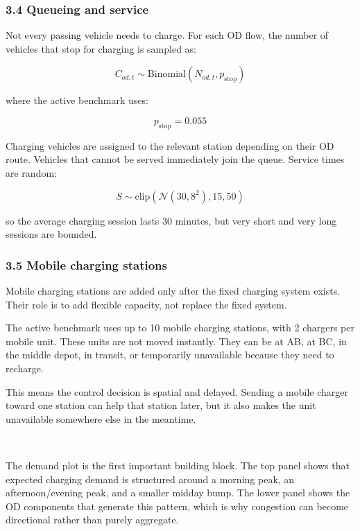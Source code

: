 \documentclass[11pt]{article}
\begin{document}
    \subsubsection{3.4 Queueing and service}\label{queueing-and-service}

Not every passing vehicle needs to charge. For each OD flow, the number
of vehicles that stop for charging is sampled as:

\[
C_{od,t} \sim \mathrm{Binomial}(N_{od,t}, p_{\mathrm{stop}})
\]

where the active benchmark uses:

\[
p_{\mathrm{stop}} = 0.055
\]

Charging vehicles are assigned to the relevant station depending on
their OD route. Vehicles that cannot be served immediately join the
queue. Service times are random:

\[
S \sim \mathrm{clip}\left(\mathcal{N}(30, 8^2), 15, 50\right)
\]

so the average charging session lasts 30 minutes, but very short and
very long sessions are bounded.

    \subsubsection{3.5 Mobile charging
stations}\label{mobile-charging-stations}

Mobile charging stations are added only after the fixed charging system
exists. Their role is to add flexible capacity, not replace the fixed
system.

The active benchmark uses up to 10 mobile charging stations, with 2
chargers per mobile unit. These units are not moved instantly. They can
be at AB, at BC, in the middle depot, in transit, or temporarily
unavailable because they need to recharge.

This means the control decision is spatial and delayed. Sending a mobile
charger toward one station can help that station later, but it also
makes the unit unavailable somewhere else in the meantime.

    \begin{center}
    \end{center}
    { \hspace*{\fill} \\}
    
    The demand plot is the first important building block. The top panel
shows that expected charging demand is structured around a morning peak,
an afternoon/evening peak, and a smaller midday bump. The lower panel
shows the OD components that generate this pattern, which is why
congestion can become directional rather than purely aggregate.
\end{document}
